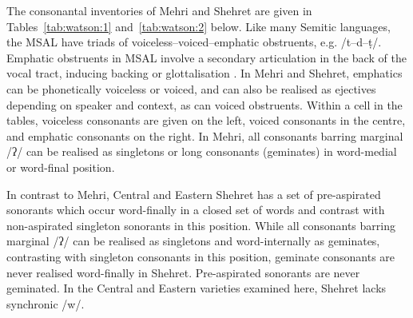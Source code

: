 \documentclass[output=paper]{langscibook}
\begin{document}
The consonantal inventories of Mehri \citep{WatsonEtAl2020} and Shehret are given in Tables~\ref{tab:watson:1} and~\ref{tab:watson:2} below. Like many Semitic languages, the MSAL have triads of voiceless–voiced–emphatic obstruents, e.g. /t–d–ṭ/. Emphatic obstruents in MSAL involve a secondary articulation in the back of the vocal tract, inducing backing or glottalisation \citep{Bellem2008}. In Mehri and Shehret, emphatics can be phonetically voiceless or voiced, and can also be realised as ejectives depending on speaker and context, as can voiced obstruents. Within a cell in the tables, voiceless consonants are given on the left, voiced consonants in the centre, and emphatic consonants on the right. In Mehri, all consonants barring marginal \mbox{/ʔ/} can be realised as singletons or long consonants (geminates) in word-medial or word-final position.

\begin{table}
\caption{Mehri consonantal phoneme table}
\label{tab:watson:1}
\end{table}

In contrast to Mehri, Central and Eastern Shehret has a set of pre-aspirated sonorants which occur word-finally in a closed set of words and contrast with non-aspirated singleton sonorants in this position. While all consonants barring marginal \mbox{/ʔ/} can be realised as singletons and word-internally as geminates, contrasting with singleton consonants in this position, geminate consonants are never realised word-finally in Shehret. Pre-aspirated sonorants are never geminated. In the Central and Eastern varieties examined here, Shehret lacks synchronic \mbox{/w/}.
\end{document}
